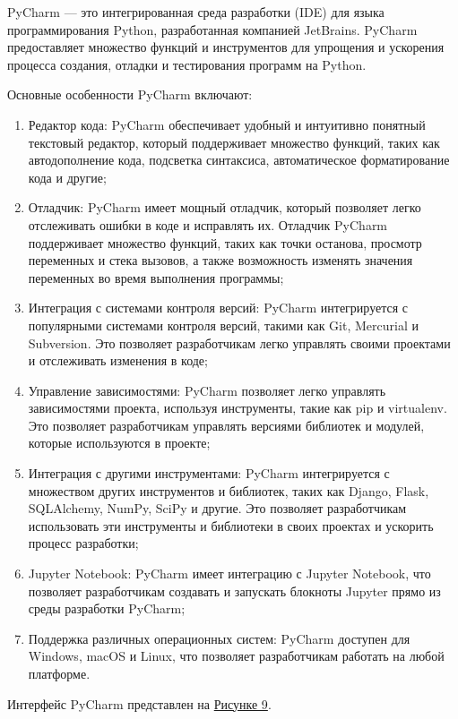     PyCharm — это интегрированная среда разработки (IDE) для языка программирования Python, разработанная компанией JetBrains. PyCharm предоставляет множество функций и инструментов для упрощения и ускорения процесса создания, отладки и тестирования программ на Python. 
    
    Основные особенности PyCharm включают:
    \begin{enumerate}
        \item Редактор кода: PyCharm обеспечивает удобный и интуитивно понятный текстовый редактор, который поддерживает множество функций, таких как автодополнение кода, подсветка синтаксиса, автоматическое форматирование кода и другие;
        \item Отладчик: PyCharm имеет мощный отладчик, который позволяет легко отслеживать ошибки в коде и исправлять их. Отладчик PyCharm поддерживает множество функций, таких как точки останова, просмотр переменных и стека вызовов, а также возможность изменять значения переменных во время выполнения программы;
        \item Интеграция с системами контроля версий: PyCharm интегрируется с популярными системами контроля версий, такими как Git, Mercurial и Subversion. Это позволяет разработчикам легко управлять своими проектами и отслеживать изменения в коде;
        \item Управление зависимостями: PyCharm позволяет легко управлять зависимостями проекта, используя инструменты, такие как pip и virtualenv. Это позволяет разработчикам управлять версиями библиотек и модулей, которые используются в проекте;
        \item Интеграция с другими инструментами: PyCharm интегрируется с множеством других инструментов и библиотек, таких как Django, Flask, SQLAlchemy, NumPy, SciPy и другие. Это позволяет разработчикам использовать эти инструменты и библиотеки в своих проектах и ускорить процесс разработки;
        \item Jupyter Notebook: PyCharm имеет интеграцию с Jupyter Notebook, что позволяет разработчикам создавать и запускать блокноты Jupyter прямо из среды разработки PyCharm;
        \item Поддержка различных операционных систем: PyCharm доступен для Windows, macOS и Linux, что позволяет разработчикам работать на любой платформе.
    \end{enumerate}

    Интерфейс PyCharm представлен на \hyperref[fig:pycharm_window]{Рисунке 9}.

